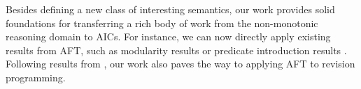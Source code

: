 Besides defining a new class of interesting semantics, our work provides solid foundations for transferring a rich body of work from the non-monotonic reasoning domain to AICs. For instance, we can now directly apply existing results from AFT, such as modularity results \cite{tocl/VennekensGD06,tocl/BogaertsVD16} or predicate introduction results \cite{VennekensMWD07a,VennekensMWD07b}. 
Following results from \citet{tplp/CaropreseT11}, our work also paves the way to applying AFT to revision programming. 

% 
%  


